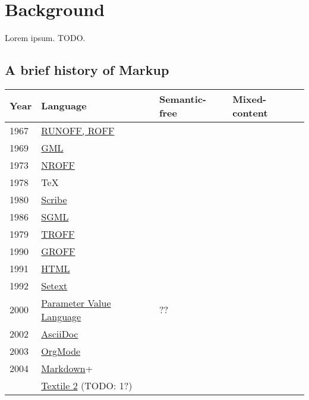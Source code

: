 \documentclass{scrreprt}
\begin{document}
%
%
%
%
%
%


\chapter{Background}
Lorem ipsum. TODO.




\section{A brief history of Markup}

\begin{tabular}{ l | l | l | l }
  \textbf{Year} &
  \textbf{Language} &
  \textbf{Semantic-free} &
  \textbf{Mixed-content}
  \\ \hline

  1967 &
  \href{http://en.wikipedia.org/wiki/RUNOFF}{RUNOFF, ROFF}

  \\ \hline
  1969 &
  \href{http://en.wikipedia.org/wiki/IBM_Generalized_Markup_Language}{GML}

  \\ \hline
  1973 &
  \href{http://en.wikipedia.org/wiki/Nroff}{NROFF}

  \\ \hline
  1978 &
  TeX

  \\ \hline
  1980 &
  \href{http://www.dtic.mil/docs/citations/ADA125287}{Scribe}

  \\ \hline
  1986 &
  \href{http://en.wikipedia.org/wiki/SGML}{SGML}

  \\ \hline
  1979 &
  \href{http://www.troff.org/history.html}{TROFF}

  \\ \hline
  1990 &
  \href{http://en.wikipedia.org/wiki/Groff_(software)}{GROFF}

  \\ \hline
  1991 &
  \href{http://alistapart.com/article/a-brief-history-of-markup}{HTML}

  \\ \hline
  1992 &
  \href{http://en.wikipedia.org/wiki/Setext}{Setext}


  \\ \hline
  2000
  & \href{http://public.ccsds.org/publications/archive/641x0b2.pdf}{Parameter Value Language}
  & ??

  \\ \hline
  2002 &
  \href{http://en.wikipedia.org/wiki/Asciidoc}{AsciiDoc}

  \\ \hline
  2003 &
  \href{http://en.wikipedia.org/wiki/Org-mode}{OrgMode}

  \\ \hline
  2004 &
  \href{http://en.wikipedia.org/wiki/Markdown}{Markdown}+


  \\ \hline
  &
  \href{http://en.wikipedia.org/wiki/Textile_(markup_language)}{Textile 2} (TODO: 1?)
\end{tabular}
\end{document}
